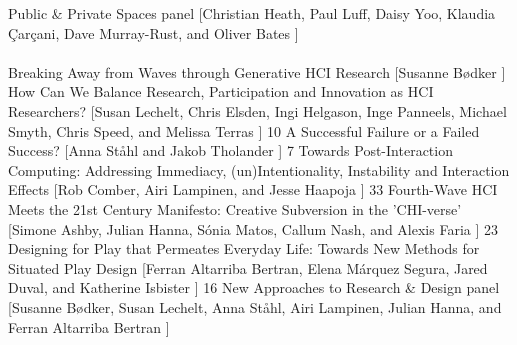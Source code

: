 \begin{sessions}
    {Public \& Private Spaces panel%
}%
    [Christian Heath, Paul Luff, Daisy Yoo, Klaudia Çarçani, Dave Murray-Rust, and Oliver Bates%
]%
    { 
}
 \\
 \\
    {Breaking Away from Waves through Generative HCI Research%
}%
    [Susanne Bødker%
]%
    { 
}
    {How Can We Balance Research, Participation and Innovation as HCI Researchers?%
}%
    [Susan Lechelt, Chris Elsden, Ingi Helgason, Inge Panneels, Michael Smyth, Chris Speed, and Melissa Terras%
]%
    { 10
}
    {A Successful Failure or a Failed Success?%
}%
    [Anna Ståhl and Jakob Tholander%
]%
    { 7
}
    {Towards Post-Interaction Computing: Addressing Immediacy, (un)Intentionality, Instability and Interaction Effects%
}%
    [Rob Comber, Airi Lampinen, and Jesse Haapoja%
]%
    { 33
}
    {Fourth-Wave HCI Meets the 21st Century Manifesto: Creative Subversion in the 'CHI-verse'%
}%
    [Simone Ashby, Julian Hanna, Sónia Matos, Callum Nash, and Alexis Faria%
]%
    { 23
}
    {Designing for Play that Permeates Everyday Life: Towards New Methods for Situated Play Design%
}%
    [Ferran Altarriba Bertran, Elena Márquez Segura, Jared Duval, and Katherine Isbister%
]%
    { 16
}
    {New Approaches to Research \& Design panel%
}%
    [Susanne Bødker, Susan Lechelt, Anna Ståhl, Airi Lampinen, Julian Hanna, and Ferran Altarriba Bertran%
]%
    { 
}
 \\
\end{sessions}
\fi


